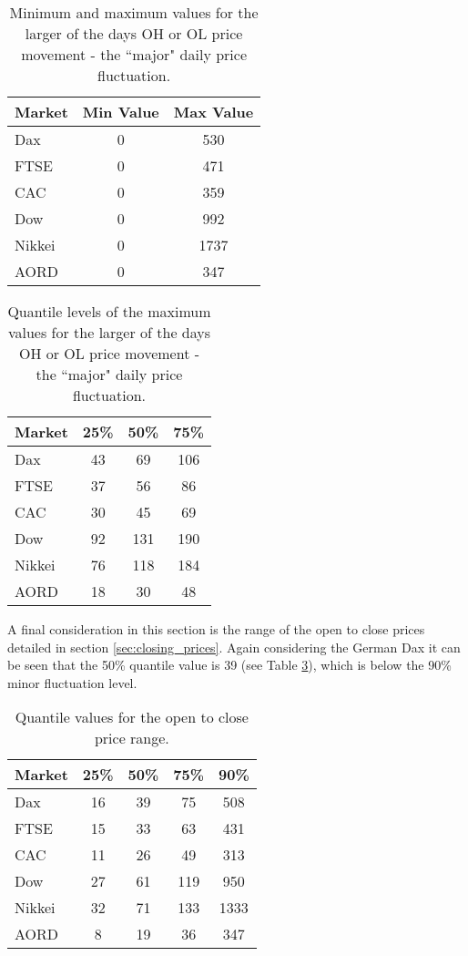 \begin{table}[!h] \centering 
  \caption[Major daily price fluctuation.]{Minimum and maximum values for the larger of the days OH or OL price movement - the \textquotedblleft major" daily price fluctuation.} 
  \label{tab:majorOH}
\begin{tabular}{lcc} 
\toprule 
Market & Min Value & Max Value  \\ 
\midrule
Dax  & 0 & 530  \\ 
FTSE & 0 & 471  \\ 
CAC  & 0 & 359  \\ 
Dow  & 0 & 992  \\ 
Nikkei & 0 & 1737  \\ 
AORD   & 0 & 347 \\ 
\bottomrule
\end{tabular} 
\end{table} 

\begin{table}[!htbp] \centering 
  \caption[Quantiles of Major daily price fluctuation.]{Quantile levels of the maximum values for the larger of the days OH or OL price movement - the \textquotedblleft major" daily price fluctuation.} 
  \label{tab:majorOHQ}
\begin{tabular}{lccc} 
\toprule 
Market & 25\% & 50\% & 75\% \\ 
\midrule
Dax  & 43  & 69 & 106  \\ 
FTSE & 37  & 56 & 86  \\ 
CAC  & 30  & 45 & 69  \\ 
Dow  & 92 & 131  & 190  \\ 
Nikkei & 76  & 118  & 184  \\ 
AORD   & 18  & 30  & 48 \\ 
\bottomrule
\end{tabular} 
\end{table} 

A final consideration in this section is the range of the open to close prices detailed in section \ref{sec:closing_prices}. Again considering the German Dax it can be seen that the 50\% quantile value is 39 (see Table \ref{tab:OCQuantile}), which is below the 90\% minor fluctuation level.

\begin{table}[!htbp] \centering 
  \caption[Quantiles of the open to close price range.]{Quantile values for the open to close price range.} 
  \label{tab:OCQuantile}
\begin{tabular}{lcccc} 
\toprule 
Market & 25\% & 50\% & 75\% & 90\% \\ 
\midrule
Dax  & 16  & 39 & 75 & 508  \\ 
FTSE & 15  & 33 & 63 & 431 \\ 
CAC  & 11  & 26 & 49 & 313 \\ 
Dow  & 27 & 61  & 119 & 950 \\ 
Nikkei & 32  & 71  & 133 & 1333 \\ 
AORD   & 8  & 19  & 36 & 347 \\ 
\bottomrule
\end{tabular} 
\end{table} 

